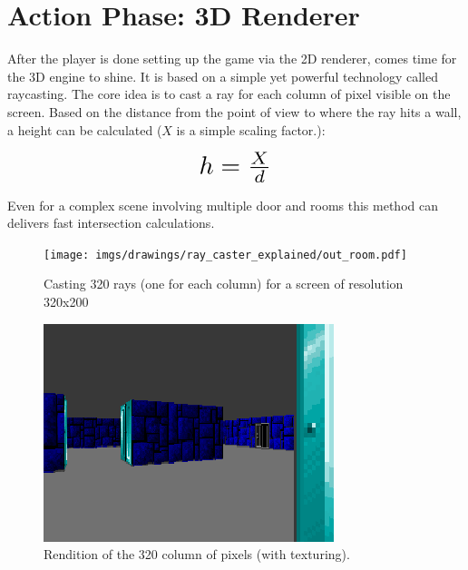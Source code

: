 \section{Action Phase: 3D Renderer}
After the player is done setting up the game via the 2D renderer, comes time for the 3D engine to shine. It is based on a simple yet powerful technology called raycasting. The core idea is to cast a ray for each column of pixel visible on the screen. Based on the distance  from the point of view to where the ray hits a wall, a height  can be calculated ($X$ is a simple scaling factor.):\\
\par
\begin{figure}[H]
  \centering
  \begin{equation*}
      \scalebox{2.0}{$h = \frac{X}{d}$} 
  \end{equation*}
\end{figure}
\par
Even for a complex scene involving multiple door and rooms this method can delivers fast intersection calculations.
\par
\begin{figure}[H]
\centering
 \texttt{[image: imgs/drawings/ray\_caster\_explained/out\_room.pdf]}
 \caption{Casting 320 rays (one for each column) for a screen of resolution 320x200} \label{fig:Raycasting2}
\end{figure}

\begin{figure}[H]
  \centering
 \includegraphics[width=\textwidth]{imgs/drawings/ray_caster_explained/out_door.png}
 \caption{Rendition of the 320 column of pixels (with texturing).} 
\end{figure} 


